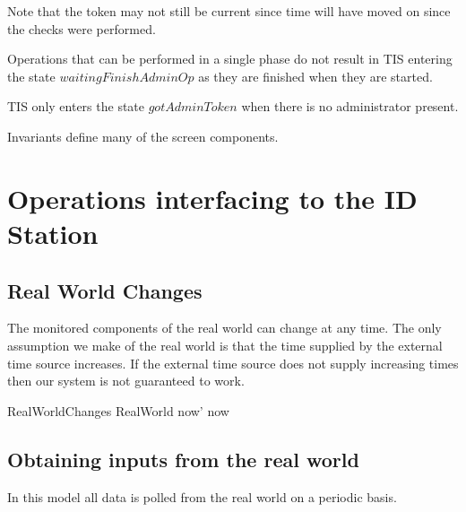 \begin{Zcomment}
\item
Note that the token may not still be current since time will have
moved on since the checks were performed.
\item
Operations that can be performed in a single phase do not result in
TIS entering the state $waitingFinishAdminOp$ as they are finished
when they are started. 
\item
TIS only enters the state $gotAdminToken$ when there is no
administrator present.
\item
Invariants define many of the screen components.
\end{Zcomment}



\chapter{Operations interfacing to the ID Station}
\label{sec:Interfaces}

\section{Real World Changes}
\label{sec:ReadWorld}
The monitored components of the real world can change at any time.
The only assumption we make of the real world is that the time
supplied by the external time source increases. If the external time
source does not supply increasing times then our system is not
guaranteed to work.

\begin{schema}{RealWorldChanges}
        \Delta RealWorld
\where
        now' \geq now
\end{schema}

\section{Obtaining inputs from the real world}

In this model all data is polled from the real world on a periodic
basis. 

